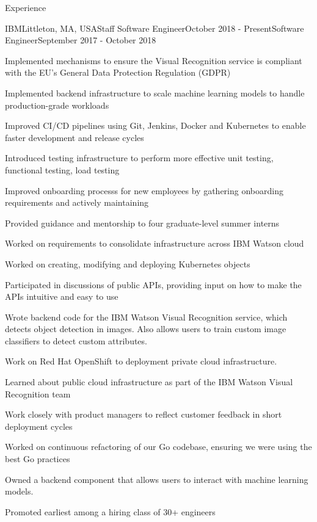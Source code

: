 \documentclass{resume}
\begin{document}
  \begin{rSection}{Experience}
    \begin{rSubsection}{IBM}{Littleton, MA, USA}{Staff Software Engineer}{October 2018 - Present}{Software Engineer}{September 2017 - October 2018}
    \item Implemented mechanisms to ensure the Visual Recognition service is compliant with the EU’s General Data Protection Regulation (GDPR)
    \item Implemented backend infrastructure to scale machine learning models to handle production-grade workloads
    \item Improved CI/CD pipelines using Git, Jenkins, Docker and Kubernetes to enable faster development and release cycles
    \item Introduced testing infrastructure to perform more effective unit testing, functional testing, load testing
    \item Improved onboarding processs for new employees by gathering onboarding requirements and actively maintaining
    \item Provided guidance and mentorship to four graduate-level summer interns
    \item Worked on requirements to consolidate infrastructure across IBM Watson cloud
    \item Worked on creating, modifying and deploying Kubernetes objects
    \item Participated in discussions of public APIs, providing input on how to make the APIs intuitive and easy to use
    \item Wrote backend code for the IBM Watson Visual Recognition service, which detects object detection in images. Also allows users to train custom image classifiers to detect custom attributes.
    \item Work on Red Hat OpenShift to deployment private cloud infrastructure.
    \item Learned about public cloud infrastructure as part of the IBM Watson Visual Recognition team
    \item Work closely with product managers to reflect customer feedback in short deployment cycles
    \item Worked on continuous refactoring of our Go codebase, ensuring we were using the best Go practices
    \item Owned a backend component that allows users to interact with machine learning models.
    \item Promoted earliest among a hiring class of 30+ engineers
    \end{rSubsection}
    

\end{rSection}
\end{document}
